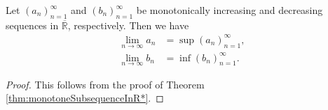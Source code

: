 \begin{coro}
  \label{coro:theEquivalenceOfMonotoneSequenceLimit}
  Let $(a_{n})_{n=1}^{\infty}$ and $(b_{n})_{n=1}^{\infty}$
  be monotonically increasing and decreasing
  sequences in $\overline{\mathbb{R}}$, respectively. Then we have
  \begin{align}
    \lim_{n\rightarrow \infty}a_{n}&=\sup(a_{n})_{n=1}^{\infty},
    \label{eq:monotonicallyIncreasingLimit}
    \\
    \lim_{n\rightarrow \infty}b_{n}&=\inf(b_{n})_{n=1}^{\infty}.
    \label{eq:monotonicallyDecreasingLimit}
  \end{align}
\end{coro}
\begin{proof}
  This follows from the proof of
  Theorem \ref{thm:monotoneSubsequenceInR*}.
\end{proof}


